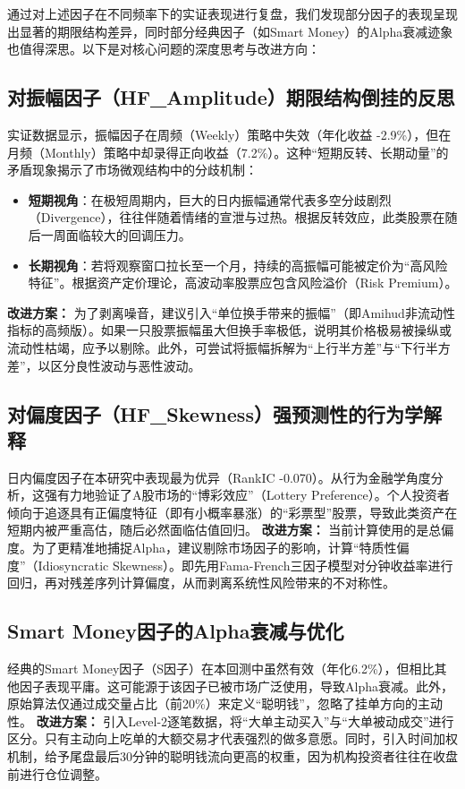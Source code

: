 \documentclass[10pt,compsoc,UTF8]{CjC}
\begin{document}
通过对上述因子在不同频率下的实证表现进行复盘，我们发现部分因子的表现呈现出显著的期限结构差异，同时部分经典因子（如Smart Money）的Alpha衰减迹象也值得深思。以下是对核心问题的深度思考与改进方向：

\subsection{对振幅因子（HF\_Amplitude）期限结构倒挂的反思}
实证数据显示，振幅因子在周频（Weekly）策略中失效（年化收益 -2.9\%），但在月频（Monthly）策略中却录得正向收益（7.2\%）。这种“短期反转、长期动量”的矛盾现象揭示了市场微观结构中的分歧机制：
\begin{itemize}
    \item \textbf{短期视角}：在极短周期内，巨大的日内振幅通常代表多空分歧剧烈（Divergence），往往伴随着情绪的宣泄与过热。根据反转效应，此类股票在随后一周面临较大的回调压力。
    \item \textbf{长期视角}：若将观察窗口拉长至一个月，持续的高振幅可能被定价为“高风险特征”。根据资产定价理论，高波动率股票应包含风险溢价（Risk Premium）。
\end{itemize}
\textbf{改进方案：} 为了剥离噪音，建议引入“单位换手带来的振幅”（即Amihud非流动性指标的高频版）。如果一只股票振幅虽大但换手率极低，说明其价格极易被操纵或流动性枯竭，应予以剔除。此外，可尝试将振幅拆解为“上行半方差”与“下行半方差”，以区分良性波动与恶性波动。

\subsection{对偏度因子（HF\_Skewness）强预测性的行为学解释}
日内偏度因子在本研究中表现最为优异（RankIC -0.070）。从行为金融学角度分析，这强有力地验证了A股市场的“博彩效应”（Lottery Preference）。个人投资者倾向于追逐具有正偏度特征（即有小概率暴涨）的“彩票型”股票，导致此类资产在短期内被严重高估，随后必然面临估值回归。
\textbf{改进方案：} 当前计算使用的是总偏度。为了更精准地捕捉Alpha，建议剔除市场因子的影响，计算“特质性偏度”（Idiosyncratic Skewness）。即先用Fama-French三因子模型对分钟收益率进行回归，再对残差序列计算偏度，从而剥离系统性风险带来的不对称性。

\subsection{Smart Money因子的Alpha衰减与优化}
经典的Smart Money因子（S因子）在本回测中虽然有效（年化6.2\%），但相比其他因子表现平庸。这可能源于该因子已被市场广泛使用，导致Alpha衰减。此外，原始算法仅通过成交量占比（前20\%）来定义“聪明钱”，忽略了挂单方向的主动性。
\textbf{改进方案：} 引入Level-2逐笔数据，将“大单主动买入”与“大单被动成交”进行区分。只有主动向上吃单的大额交易才代表强烈的做多意愿。同时，引入时间加权机制，给予尾盘最后30分钟的聪明钱流向更高的权重，因为机构投资者往往在收盘前进行仓位调整。
\end{document}
